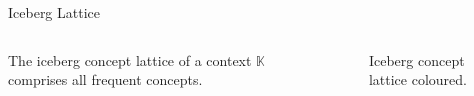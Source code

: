 \begin{frame}{Iceberg Lattice~\parencite{titanic_2002}}
\begin{columns}
    \begin{column}{0.7\textwidth}
        \begin{definition}
        The iceberg concept lattice of a context $\mathbb{K}$ comprises all frequent concepts.
        \end{definition}

    \end{column}
    \begin{column}{0.25\textwidth}
    \begin{figure}[htbp]
        \centering
        \resizebox{\textwidth}{!}{\FormalConceptGraphColoured}
        \caption{Iceberg concept lattice coloured.}
        \label{fig:titanic_formal_concept_graph_coloured}
    \end{figure}
    \end{column}
\end{columns}
\end{frame}